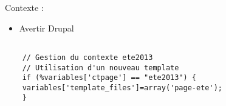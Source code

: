 \documentclass{beamer}
\begin{document}
	
	\begin{frame}[fragile]
	\begin{large}
		Contexte : \newline \pause
	\end{large}
	
	\begin{itemize}
		\item Avertir Drupal
	\end{itemize}
	\begin{lstlisting}
	
	// Gestion du contexte ete2013
	// Utilisation d'un nouveau template
	if (%variables['ctpage'] == "ete2013") {
	variables['template_files']=array('page-ete');
	}
	\end{lstlisting}
\end{frame}
\end{document}
